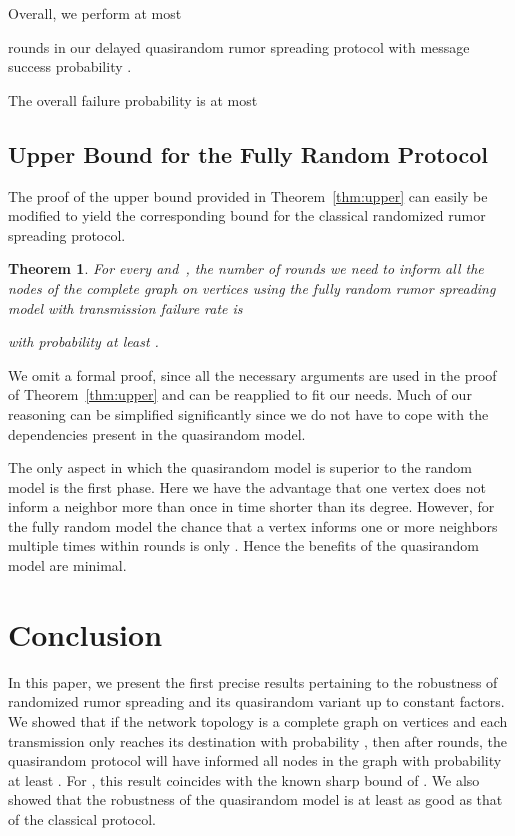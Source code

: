 \documentclass[12pt]{article}
\newtheorem{theorem}{Theorem}
\begin{document}
{Overall, we perform at most

rounds in our delayed quasirandom rumor spreading protocol with message success probability .

The overall failure probability is at most



\subsection{Upper Bound for the Fully Random Protocol}

The proof of the upper bound provided in Theorem~\ref{thm:upper} can easily be modified to yield the corresponding bound for the classical randomized rumor spreading protocol.

\begin{theorem}\label{thm:upperrandom}
For every  and~, the number of rounds we need to inform all the nodes of the complete graph on  vertices using the fully random rumor spreading model with transmission failure rate  is
 
with probability at least .
\end{theorem}

We omit a formal proof, since all the necessary arguments are used in the proof of Theorem~\ref{thm:upper} and can be reapplied to fit our needs. Much of our reasoning can be simplified significantly since we do not have to cope with the dependencies present in the quasirandom model. 

The only aspect in which the quasirandom model is superior to the random model is the first phase. Here we have the advantage that one vertex does not inform a neighbor more than once in time shorter than its degree. However, for the fully random model the chance that a vertex informs one or more neighbors multiple times within  rounds is only . Hence the benefits of the quasirandom model are minimal.


\section{Conclusion}

In this paper, we present the first precise results pertaining to the robustness of randomized rumor spreading and its quasirandom variant up to constant factors. We showed that if the network topology is a complete graph on  vertices and each transmission only reaches its destination with probability , then after  rounds, the quasirandom protocol will have informed all nodes in the graph with probability at least . For , this result coincides with the known sharp bound of . We also showed that the robustness of the quasirandom model is at least as good as that of the classical protocol. 

}
\end{document}
